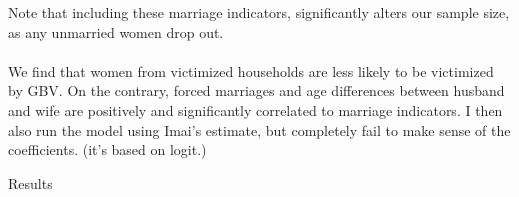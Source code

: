 \documentclass[11pt,a4paper]{scrartcl} %
\begin{document}
Note that including these marriage indicators, significantly alters our sample size, as any unmarried women drop out.

\paragraph{}
We find that women from victimized households are less likely to be victimized by GBV. On the contrary, forced marriages and age differences between husband and wife are positively and significantly correlated to marriage indicators. I then also run the model using Imai's estimate, but completely fail to make sense of the coefficients. (it's based on logit.)





\begin{table}
	\caption{Results}\label{table:results}
	\begin{center}
	
	\end{center}
\end{table}



\clearpage 



\end{document}
